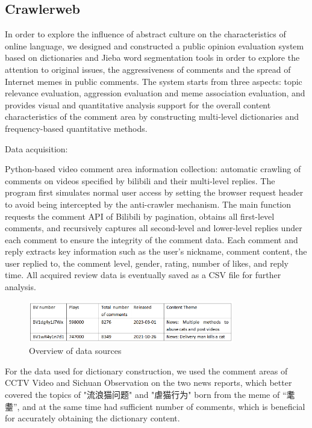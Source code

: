 \documentclass[12pt,a4paper]{ctexart}
\theoremstyle{MyLineTheoremStyle}
\theoremstyle{MyBlockTheoremStyle}
\theoremstyle{MySubsubsectionStyle}
\begin{document}
\subsection{Crawlerweb}

In order to explore the influence of abstract culture on the characteristics of online language, we designed and constructed a public opinion evaluation system based on dictionaries and Jieba word segmentation tools in order to explore the attention to original issues, the aggressiveness of comments and the spread of Internet memes in public comments. The system starts from three aspects: topic relevance evaluation, aggression evaluation and meme association evaluation, and provides visual and quantitative analysis support for the overall content characteristics of the comment area by constructing multi-level dictionaries and frequency-based quantitative methods.

Data acquisition:

Python-based video comment area information collection: automatic crawling of comments on videos specified by bilibili and their multi-level replies. The program first simulates normal user access by setting the browser request header to avoid being intercepted by the anti-crawler mechanism. The main function requests the comment API of Bilibili by pagination, obtains all first-level comments, and recursively captures all second-level and lower-level replies under each comment to ensure the integrity of the comment data. Each comment and reply extracts key information such as the user's nickname, comment content, the user replied to, the comment level, gender, rating, number of likes, and reply time. All acquired review data is eventually saved as a CSV file for further analysis.

\begin{figure}[htbp]
    \centering
    \includegraphics[width=0.8\textwidth]{img/data_sources_1.png}
    \caption{Overview of data sources}
    \label{fig:data_sources_1}
\end{figure}
\newpage

For the data used for dictionary construction, we used the comment areas of CCTV Video and Sichuan Observation on the two news reports, which better covered the topics of "流浪猫问题" and "虐猫行为" born from the meme of “耄耋”, and at the same time had sufficient number of comments, which is beneficial for accurately obtaining the dictionary content.
\end{document}
